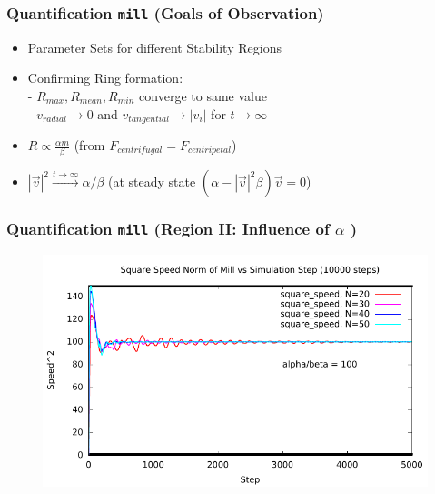 \documentclass[compress]{beamer}
\begin{document}
\begin{frame}
	\frametitle{Quantification \texttt{mill} \small (Goals of Observation)} \normalsize
	\begin{itemize}
		\item Parameter Sets for different Stability Regions
		\item Confirming Ring formation: \\
			- \( R_{max}, R_{mean}, R_{min} \) converge to same value \\
			- \( v_{radial} \to 0 \) and \( v_{tangential} \to | v_{i} |  \) for \( t \to \infty \)
		\item  \( R \propto \frac{\alpha m}{\beta}\) \small (from  \( F_{centrifugal} = F_{centripetal} \)) \normalsize
		\item \( |\vec{v}|^{2} \xrightarrow{t \to \infty}  \alpha / \beta \) \small(at steady state \( (\alpha - |\vec{v}|^2 \beta ) \vec{v} = 0 \)) 
\normalsize
	\end{itemize}
\end{frame}




\begin{frame}
	\frametitle{Quantification \texttt{mill} \small (Region II: Influence of \( \alpha \) )} \normalsize
	\begin{figure}[H]
		\includegraphics[width=1. \columnwidth]{../plots/mill_II_square_dt_allN.pdf}
	\end{figure}	
\end{frame}
\end{document}
